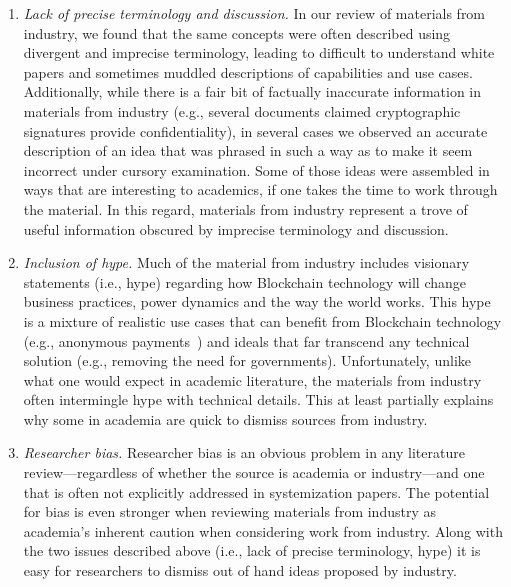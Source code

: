 \begin{enumerate}
	\item \emph{Lack of precise terminology and discussion.}
	In our review of materials from industry, we found that the same concepts were often described using divergent and imprecise terminology, leading to difficult to understand white papers and sometimes muddled descriptions of capabilities and use cases.
	Additionally, while there is a fair bit of factually inaccurate information in materials from industry (e.g., several documents claimed cryptographic signatures provide confidentiality), in several cases we  observed an accurate description of an idea that was phrased in such a way as to make it seem incorrect under cursory examination. Some of those ideas were assembled in ways that are interesting to academics, if one takes the time to work through the material.
	In this regard, materials from industry represent a trove of useful information obscured by imprecise terminology and discussion.
	
	\item \emph{Inclusion of hype.}
	Much of the material from industry includes visionary statements (i.e., hype) regarding how Blockchain technology will change business practices, power dynamics and the way the world works.
	This hype is a mixture of realistic use cases that can benefit from Blockchain technology (e.g., anonymous payments~\cite{chaum1988untraceable}) and ideals that far transcend any technical solution (e.g., removing the need for governments).
	Unfortunately, unlike what one would expect in academic literature, the materials from industry often intermingle hype with technical details. This at least partially explains why some in academia are quick to dismiss sources from industry.
	
	\item \emph{Researcher bias.}	
	Researcher bias is an obvious problem in any literature review---regardless of whether the source is academia or industry---and one that is often not explicitly addressed in systemization papers.
	The potential for bias is even stronger when reviewing materials from industry as academia's inherent caution when considering work from industry.
	Along with the two issues described above (i.e., lack of precise terminology, hype) it is easy for researchers to dismiss out of hand ideas proposed by industry.
	
\end{enumerate}


